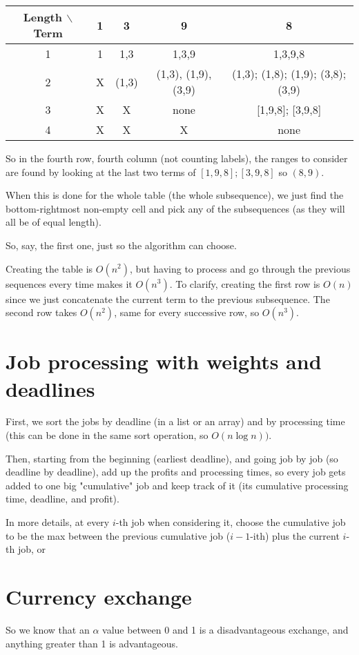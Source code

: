 \documentclass[11pt,letterpaper]{article}
\begin{document}
		\begin{tabular}{|c|c|c|c|c|}
			Length $\backslash$ Term & 1 & 3 & 9 & 8 \\ 
			\hline 
			1 & 1 & 1,3 & 1,3,9 & 1,3,9,8 \\ 
			\hline 
			2 & X & (1,3) & (1,3), (1,9), (3,9) & (1,3); (1,8); (1,9); (3,8); (3,9) \\ 
			\hline 
			3 & X & X & none & [1,9,8]; [3,9,8] \\ 
			\hline 
			4 & X & X & X & none \\ 
		\end{tabular}
		
		So in the fourth row, fourth column (not counting labels), the ranges to consider are found by looking at the last two terms of $[1,9,8]; [3,9,8]$ so $(8,9)$.
		
		When this is done for the whole table (the whole subsequence), we just find the bottom-rightmost non-empty cell and pick any of the subsequences (as they will all be of equal length).
		
		So, say, the first one, just so the algorithm can choose.
		
		Creating the table is $O(n^2)$, but having to process and go through the previous sequences every time makes it $O(n^3)$.
		To clarify, creating the first row is $O(n)$ since we just concatenate the current term to the previous subsequence.
		The second row takes $O(n^2)$, same for every successive row, so $O(n^3)$.
	
	\section{Job processing with weights and deadlines}
		First, we sort the jobs by deadline (in a list or an array) and by processing time (this can be done in the same sort operation, so $O(n\log n))$.
		
		Then, starting from the beginning (earliest deadline), and going job by job (so deadline by deadline), add up the profits and processing times, so every job gets added to one big "cumulative" job and keep track of it (its cumulative processing time, deadline, and profit).
		
		In more details, at every $i$-th job when considering it, choose the cumulative job to be the max between the previous cumulative job ($i-1$-ith) plus the current $i$-th job, or
	
	\section{Currency exchange}
		So we know that an $\alpha$ value between 0 and 1 is a disadvantageous exchange, and anything greater than 1 is advantageous.
		
\end{document}
